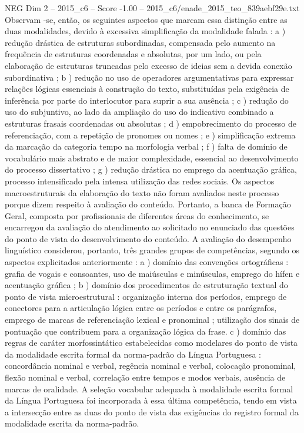 \begin{textsample}{NEG Dim 2 – 2015\_c6 – Score -1.00 – 2015\_c6/enade\_2015\_teo\_839aebf29e.txt}
Observam -se, então, os seguintes aspectos que marcam essa distinção entre as duas modalidades, devido à excessiva simplificação da modalidade falada : a ) redução drástica de estruturas subordinadas, compensada pelo aumento na frequência de estruturas coordenadas e absolutas, por um lado, ou pela elaboração de estruturas truncadas pelo excesso de ideias sem a devida conexão subordinativa ; b ) redução no uso de operadores argumentativas para expressar relações lógicas essenciais à construção do texto, substituídas pela exigência de inferência por parte do interlocutor para suprir a sua ausência ; c ) redução do uso do subjuntivo, ao lado da ampliação do uso do indicativo combinado a estruturas frasais coordenadas ou absolutas ; d ) empobrecimento do processo de referenciação, com a repetição de pronomes ou nomes ; e ) simplificação extrema da marcação da categoria tempo na morfologia verbal ; f ) falta de domínio de vocabulário mais abstrato e de maior complexidade, essencial ao desenvolvimento do processo dissertativo ; g ) redução drástica no emprego da acentuação gráfica, processo intensificado pela intensa utilização das redes sociais.
Os aspectos macroestruturais da elaboração do texto não foram avaliados neste processo porque dizem respeito à avaliação do conteúdo.
Portanto, a banca de Formação Geral, composta por profissionais de diferentes áreas do conhecimento, se encarregou da avaliação do atendimento ao solicitado no enunciado das questões do ponto de vista do desenvolvimento do conteúdo.
A avaliação do desempenho linguístico considerou, portanto, três grandes grupos de competências, segundo os aspectos explicitados anteriormente : a ) domínio das convenções ortográficas : grafia de vogais e consoantes, uso de maiúsculas e minúsculas, emprego do hífen e acentuação gráfica ; b ) domínio dos procedimentos de estruturação textual do ponto de vista microestrutural : organização interna dos períodos, emprego de conectores para a articulação lógica entre os períodos e entre os parágrafos, emprego de marcas de referenciação lexical e pronominal ; utilização dos sinais de pontuação que contribuem para a organização lógica da frase. c ) domínio das regras de caráter morfossintático estabelecidas como modelares do ponto de vista da modalidade escrita formal da norma-padrão da Língua Portuguesa : concordância nominal e verbal, regência nominal e verbal, colocação pronominal, flexão nominal e verbal, correlação entre tempos e modos verbais, ausência de marcas de oralidade.
A seleção vocabular adequada à modalidade escrita formal da Língua Portuguesa foi incorporada à essa última competência, tendo em vista a intersecção entre as duas do ponto de vista das exigências do registro formal da modalidade escrita da norma-padrão.

\end{textsample}
